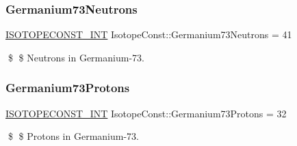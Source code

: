 \subsubsection{\texorpdfstring{Germanium73\+Neutrons}{Germanium73Neutrons}}
{\footnotesize\ttfamily \mbox{\hyperlink{group___isotope_const-_macros_ga5f18360b3e99483a35c32d789e62621c}{I\+S\+O\+T\+O\+P\+E\+C\+O\+N\+S\+T\+\_\+\+I\+NT}} Isotope\+Const\+::\+Germanium73\+Neutrons = 41}

\$ \$ Neutrons in Germanium-\/73. \mbox{\label{group___isotope_const-_germanium-_ge73_ga28bfaad594c89b65206c3a7405810120}} 
\subsubsection{\texorpdfstring{Germanium73\+Protons}{Germanium73Protons}}
{\footnotesize\ttfamily \mbox{\hyperlink{group___isotope_const-_macros_ga5f18360b3e99483a35c32d789e62621c}{I\+S\+O\+T\+O\+P\+E\+C\+O\+N\+S\+T\+\_\+\+I\+NT}} Isotope\+Const\+::\+Germanium73\+Protons = 32}

\$ \$ Protons in Germanium-\/73. 